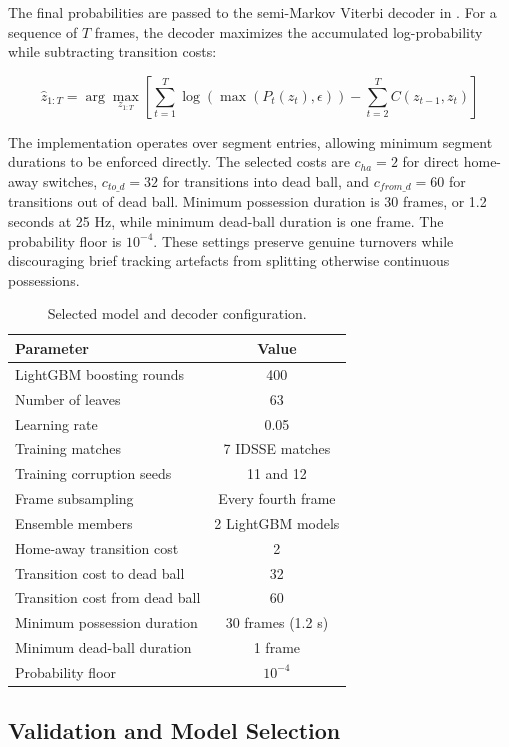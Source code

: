 \documentclass[11pt,a4paper]{article}
\begin{document}
The final probabilities are passed to the semi-Markov Viterbi decoder in . For a sequence of \(T\) frames, the decoder maximizes the accumulated log-probability while subtracting transition costs:

\[
\hat{z}_{1:T}
=
\arg\max_{z_{1:T}}
\left[
\sum_{t=1}^{T}
\log\left(\max(P_t(z_t),\epsilon)\right)
-
\sum_{t=2}^{T}C(z_{t-1},z_t)
\right]
\]

The implementation operates over segment entries, allowing minimum segment durations to be enforced directly. The selected costs are \(c_{ha}=2\) for direct home-away switches, \(c_{to\_d}=32\) for transitions into dead ball, and \(c_{from\_d}=60\) for transitions out of dead ball. Minimum possession duration is 30 frames, or 1.2 seconds at 25 Hz, while minimum dead-ball duration is one frame. The probability floor is \(10^{-4}\). These settings preserve genuine turnovers while discouraging brief tracking artefacts from splitting otherwise continuous possessions.

\begin{table}[H]
\centering
\small
\caption{Selected model and decoder configuration.}

\begin{tabular}{lc}
\toprule
\textbf{Parameter} & \textbf{Value} \\
\midrule
LightGBM boosting rounds & 400 \\
Number of leaves & 63 \\
Learning rate & 0.05 \\
Training matches & 7 IDSSE matches \\
Training corruption seeds & 11 and 12 \\
Frame subsampling & Every fourth frame \\
Ensemble members & 2 LightGBM models \\
Home-away transition cost & 2 \\
Transition cost to dead ball & 32 \\
Transition cost from dead ball & 60 \\
Minimum possession duration & 30 frames (1.2 s) \\
Minimum dead-ball duration & 1 frame \\
Probability floor & \(10^{-4}\) \\
\bottomrule
\end{tabular}
\end{table}

\subsection{Validation and Model Selection}
\end{document}
